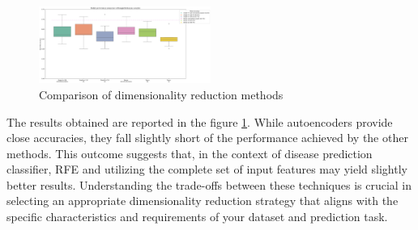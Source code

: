 \begin{figure}[h!]
    \includegraphics[width=0.5\textwidth]{figures/autoencoder_results.png}
    \caption{Comparison of dimensionality reduction methods}
    \label{fig:autoencoders}
    \Description{}
\end{figure}
 
The results obtained are reported in the figure \ref{fig:autoencoders}. While autoencoders provide close accuracies, they fall slightly short of the performance achieved by the other methods. This outcome suggests that, in the context of disease prediction classifier, RFE and utilizing the complete set of input features may yield slightly better results. Understanding the trade-offs between these techniques is crucial in selecting an appropriate dimensionality reduction strategy that aligns with the specific characteristics and requirements of your dataset and prediction task.


